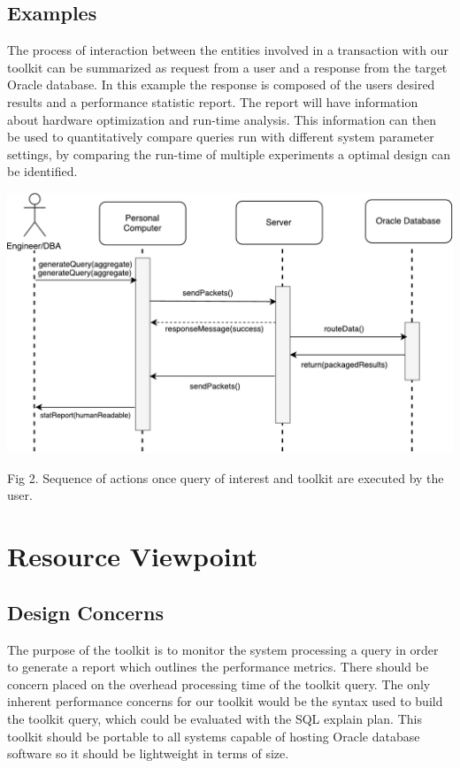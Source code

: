 \documentclass[draftclsnofoot, onecolumn, compsoc, 10pt]{IEEEtran}
\begin{document}
\subsection{Examples}
The process of interaction between the entities involved in a transaction with our toolkit can be summarized as request from a user and a response from the target Oracle database. In this example the response is composed of the users desired results and a performance statistic report.
The report will have information about hardware optimization and run-time analysis.
This information can then be used to quantitatively compare queries run with different system parameter settings, by comparing the run-time of multiple experiments a optimal design can be identified. 

\begin{center}
	\includegraphics[width=6in]{Sequence_Diagram.pdf}

	Fig 2. Sequence of actions once query of interest and toolkit are executed by the user.
\end{center}


\section{Resource Viewpoint}
\subsection{Design Concerns}
The purpose of the toolkit is to monitor the system processing a query in order to generate a report which outlines the performance metrics.
There should be concern placed on the overhead processing time of the toolkit query.
The only inherent performance concerns for our toolkit would be the syntax used to build the toolkit query, which could be evaluated with the SQL explain plan. This toolkit should be portable to all systems capable of hosting Oracle database software so it should be lightweight in terms of size. 
\end{document}
